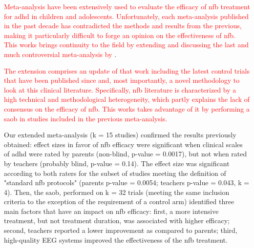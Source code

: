 

\textcolor{red}{\noindent Meta-analysis have been extensively used to
evaluate the efficacy of \gls{nfb} treatment for \gls{adhd} in children and adolescents. 
Unfortunately, each meta-analysis published in the past decade has contradicted the methods and
results from the previous, making it particularly difficult to forge an opinion
on the effectiveness of \gls{nfb}. This works brings continuity to the field by extending and discussing the last and much 
controversial meta-analysis by} \citet{Cortese2016}. 


\textcolor{red}{The extension comprises an update of that work including the latest control trials 
that have been published since and, most importantly, a
novel methodology to look at this clinical literature. Specifically, \gls{nfb} literature is characterized 
by a high technical and methodological heterogeneity, which partly explains the lack of consensus on 
the efficacy of \gls{nfb}. This works takes advantage of it by performing a \gls{saob} in studies included in the previous meta-analysis.}

Our extended meta-analysis (k = 15 studies) confirmed the results previously
obtained: effect sizes in favor of \gls{nfb} efficacy were significant when clinical scales of \gls{adhd}
were rated by parents (non-blind, p-value = 0.0017), but not when rated by
teachers (probably blind, p-value = 0.14). The effect size was significant
according to both raters for the subset of studies meeting the definition of
"standard \gls{nfb} protocols" (parents p-value = 0.0054; teachers p-value = 0.043, k
= 4). Then, the \gls{saob}, performed on k = 32 trials (meeting the same inclusion
criteria to the exception of the requirement of a control arm)
identified three main factors that have an impact on \gls{nfb} efficacy: first, a more
intensive treatment, but not treatment duration, was associated with higher
efficacy; second, teachers reported a lower improvement as compared to parents;
third, high-quality EEG systems improved the effectiveness of the \gls{nfb} treatment.


